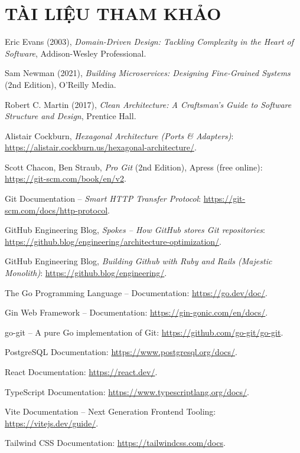 \chapter*{TÀI LIỆU THAM KHẢO}

\begin{enumerate}[leftmargin=2em,label={[\arabic*]}]
\item Eric Evans (2003), \textit{Domain-Driven Design: Tackling Complexity in the Heart of Software}, Addison-Wesley Professional.
\item Sam Newman (2021), \textit{Building Microservices: Designing Fine-Grained Systems} (2nd Edition), O'Reilly Media.
\item Robert C. Martin (2017), \textit{Clean Architecture: A Craftsman's Guide to Software Structure and Design}, Prentice Hall.
\item Alistair Cockburn, \textit{Hexagonal Architecture (Ports \& Adapters)}: \url{https://alistair.cockburn.us/hexagonal-architecture/}.
\item Scott Chacon, Ben Straub, \textit{Pro Git} (2nd Edition), Apress (free online): \url{https://git-scm.com/book/en/v2}.
\item Git Documentation -- \textit{Smart HTTP Transfer Protocol}: \url{https://git-scm.com/docs/http-protocol}.
\item GitHub Engineering Blog, \textit{Spokes -- How GitHub stores Git repositories}: \url{https://github.blog/engineering/architecture-optimization/}.
\item GitHub Engineering Blog, \textit{Building Github with Ruby and Rails (Majestic Monolith)}: \url{https://github.blog/engineering/}.
\item The Go Programming Language -- Documentation: \url{https://go.dev/doc/}.
\item Gin Web Framework -- Documentation: \url{https://gin-gonic.com/en/docs/}.
\item go-git -- A pure Go implementation of Git: \url{https://github.com/go-git/go-git}.
\item PostgreSQL Documentation: \url{https://www.postgresql.org/docs/}.
\item React Documentation: \url{https://react.dev/}.
\item TypeScript Documentation: \url{https://www.typescriptlang.org/docs/}.
\item Vite Documentation -- Next Generation Frontend Tooling: \url{https://vitejs.dev/guide/}.
\item Tailwind CSS Documentation: \url{https://tailwindcss.com/docs}.

\end{enumerate}
